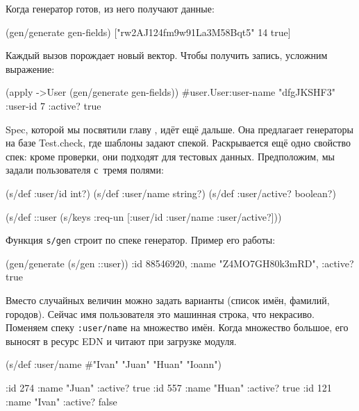 \noindent
Когда генератор готов, из него получают данные:

\begin{english}
  \begin{clojure}
(gen/generate gen-fields)
["rw2AJ124fm9w91La3M58Bqt5" 14 true]
  \end{clojure}
\end{english}

\noindent
Каждый вызов порождает новый вектор. Чтобы получить запись, усложним выражение:

\begin{english}
  \begin{clojure}
(apply ->User (gen/generate gen-fields))
#user.User{:user-name "dfgJKSHF3"
           :user-id 7
           :active? true}
  \end{clojure}
\end{english}

Spec, которой мы посвятили главу , идёт ещё дальше. Она
предлагает генераторы на базе Test.check, где шаблоны задают
спекой. Раскрывается ещё одно свойство спек: кроме проверки, они подходят для
тестовых данных. Предположим, мы задали пользователя с~тремя полями:

\begin{english}
  \begin{clojure}
(s/def :user/id int?)
(s/def :user/name string?)
(s/def :user/active? boolean?)

(s/def ::user (s/keys :req-un [:user/id
                               :user/name
                               :user/active?]))
  \end{clojure}
\end{english}

\noindent
Функция \verb|s/gen| строит по спеке генератор. Пример его работы:

\begin{english}
  \begin{clojure}
(gen/generate (s/gen ::user))
{:id 88546920, :name "Z4MO7GH80k3mRD", :active? true}
  \end{clojure}
\end{english}

Вместо случайных величин можно задать варианты (список имён, фамилий,
городов). Сейчас имя пользователя это машинная строка, что некрасиво. Поменяем
спеку \verb|:user/name| на множество имён. Когда множество большое, его выносят
в ресурс EDN и читают при загрузке модуля.

\begin{english}
  \begin{clojure}
(s/def :user/name #{"Ivan" "Juan" "Huan" "Ioann"})

{:id 274 :name "Juan" :active? true}
{:id 557 :name "Huan" :active? true}
{:id 121 :name "Ivan" :active? false}
  \end{clojure}
\end{english}

